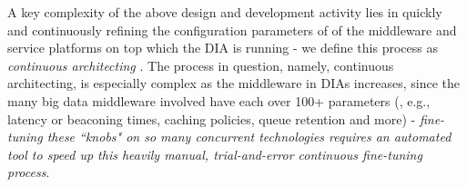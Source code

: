 A key complexity of the above design and development activity lies in quickly and continuously refining the configuration parameters of of the middleware and service platforms on top which the DIA is running - we define this process as \emph{continuous architecting} \cite{wicsabd}. The process in question, namely, continuous architecting, is especially complex as the middleware in DIAs increases, since the many big data middleware involved have each over 100+ parameters (, e.g., latency or beaconing times, caching policies, queue retention and more) - \emph{fine-tuning these ``knobs" on so many concurrent technologies requires an automated tool to speed up this heavily manual, trial-and-error continuous fine-tuning process}.
%
%
%

